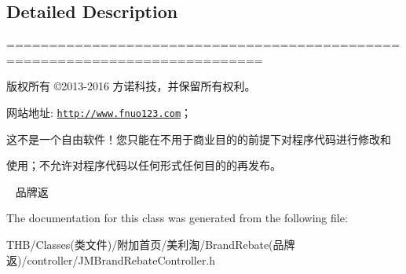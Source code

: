 \subsection{Detailed Description}
============================================================================

版权所有 ©2013-\/2016 方诺科技，并保留所有权利。

网站地址\+: \href{http://www.fnuo123.com}{\tt http\+://www.\+fnuo123.\+com}； 



这不是一个自由软件！您只能在不用于商业目的的前提下对程序代码进行修改和

使用；不允许对程序代码以任何形式任何目的的再发布。 



~\newline
品牌返 

The documentation for this class was generated from the following file\+:\begin{DoxyCompactItemize}
\item 
T\+H\+B/\+Classes(类文件)/附加首页/美利淘/\+Brand\+Rebate(品牌返)/controller/J\+M\+Brand\+Rebate\+Controller.\+h\end{DoxyCompactItemize}

